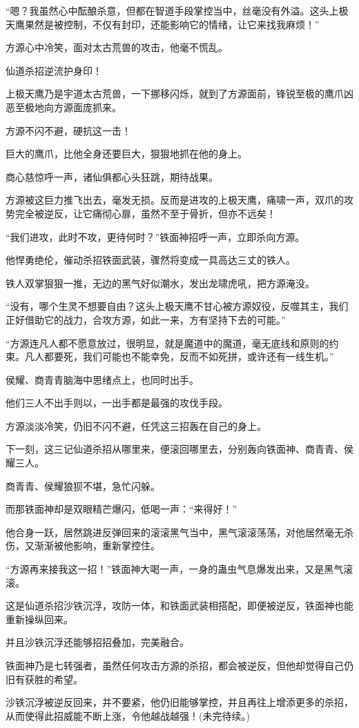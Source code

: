 \begin{this_body}
“嗯？我虽然心中酝酿杀意，但都在智道手段掌控当中，丝毫没有外溢。这头上极天鹰果然是被控制，不仅有封印，还能影响它的情绪，让它来找我麻烦！”

方源心中冷笑，面对太古荒兽的攻击，他毫不慌乱。

仙道杀招逆流护身印！

上极天鹰乃是宇道太古荒兽，一下挪移闪烁，就到了方源面前，锋锐至极的鹰爪凶恶至极地向方源面庞抓来。

方源不闪不避，硬抗这一击！

巨大的鹰爪，比他全身还要巨大，狠狠地抓在他的身上。

商心慈惊呼一声，诸仙俱都心头狂跳，期待战果。

方源被这巨力推飞出去，毫发无损。反而是进攻的上极天鹰，痛啸一声，双爪的攻势完全被逆反，让它痛彻心扉，虽然不至于骨折，但亦不远矣！

“我们进攻，此时不攻，更待何时？”铁面神招呼一声，立即杀向方源。

他悍勇绝伦，催动杀招铁面武装，骤然将变成一具高达三丈的铁人。

铁人双掌狠狠一推，无边的黑气好似潮水，发出龙啸虎吼，把方源淹没。

“没有，哪个生灵不想要自由？这头上极天鹰不甘心被方源奴役，反噬其主，我们正好借助它的战力，合攻方源，如此一来，方有坚持下去的可能。”

“方源连凡人都不愿意放过，很明显，就是魔道中的魔道，毫无底线和原则的约束。凡人都要死，我们可能也不能幸免，反而不如死拼，或许还有一线生机。”

侯耀、商青青脑海中思绪点上，也同时出手。

他们三人不出手则以，一出手都是最强的攻伐手段。

方源淡淡冷笑，仍旧不闪不避，任凭这三招轰在自己的身上。

下一刻，这三记仙道杀招从哪里来，便滚回哪里去，分别轰向铁面神、商青青、侯耀三人。

商青青、侯耀狼狈不堪，急忙闪躲。

而那铁面神却是双眼精芒爆闪，低喝一声：“来得好！”

他合身一跃，居然跳进反弹回来的滚滚黑气当中，黑气滚滚荡荡，对他居然毫无杀伤，又渐渐被他影响，重新掌控住。

“方源再来接我这一招！”铁面神大喝一声，一身的蛊虫气息爆发出来，又是黑气滚滚。

这是仙道杀招沙铁沉浮，攻防一体，和铁面武装相搭配，即便被逆反，铁面神也能重新操纵回来。

并且沙铁沉浮还能够招招叠加，完美融合。

铁面神乃是七转强者，虽然任何攻击方源的杀招，都会被逆反，但他却觉得自己仍旧有获胜的希望。

沙铁沉浮被逆反回来，并不要紧，他仍旧能够掌控，并且再往上增添更多的杀招，从而使得此招威能不断上涨，令他越战越强！(未完待续。)

\end{this_body}

